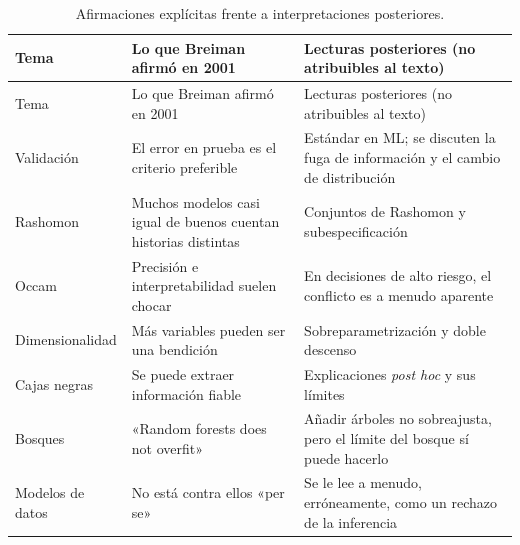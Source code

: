 \documentclass[11pt,a4paper]{article}
\begin{document}
\begin{longtable}[]{@{}
  >{\raggedright\arraybackslash}p{}
  >{\raggedright\arraybackslash}p{}
  >{\raggedright\arraybackslash}p{}@{}}
\caption{Afirmaciones explícitas frente a interpretaciones posteriores.}\label{tbl-lecturas}\tabularnewline
\toprule\noalign{}
\begin{minipage}[b]{\linewidth}\raggedright
Tema
\end{minipage} & \begin{minipage}[b]{\linewidth}\raggedright
Lo que Breiman afirmó en 2001
\end{minipage} & \begin{minipage}[b]{\linewidth}\raggedright
Lecturas posteriores (no atribuibles al texto)
\end{minipage} \\
\midrule\noalign{}
\endfirsthead
\toprule\noalign{}
\begin{minipage}[b]{\linewidth}\raggedright
Tema
\end{minipage} & \begin{minipage}[b]{\linewidth}\raggedright
Lo que Breiman afirmó en 2001
\end{minipage} & \begin{minipage}[b]{\linewidth}\raggedright
Lecturas posteriores (no atribuibles al texto)
\end{minipage} \\
\midrule\noalign{}
\endhead
\bottomrule\noalign{}
\endlastfoot
Validación & El error en prueba es el criterio preferible & Estándar en ML; se discuten la fuga de información y el cambio de distribución \autocite{kapoor2023,damour2022} \\
Rashomon & Muchos modelos casi igual de buenos cuentan historias distintas & Conjuntos de Rashomon y subespecificación \autocite{fisher2019,semenova2022,damour2022} \\
Occam & Precisión e interpretabilidad suelen chocar & En decisiones de alto riesgo, el conflicto es a menudo aparente \autocite{rudin2019} \\
Dimensionalidad & Más variables pueden ser una bendición & Sobreparametrización y doble descenso \autocite{belkin2019,zhang2017} \\
Cajas negras & Se puede extraer información fiable & Explicaciones \emph{post hoc} y sus límites \autocite{lundberg2017,ribeiro2016,rudin2019} \\
Bosques & «Random forests does not overfit» \autocite[213]{breiman2001} & Añadir árboles no sobreajusta, pero el límite del bosque sí puede hacerlo \autocite[596--597]{hastie2009} \\
Modelos de datos & No está contra ellos «per se» \autocite[214]{breiman2001} & Se le lee a menudo, erróneamente, como un rechazo de la inferencia \\
\end{longtable}
\endgroup
\end{document}

